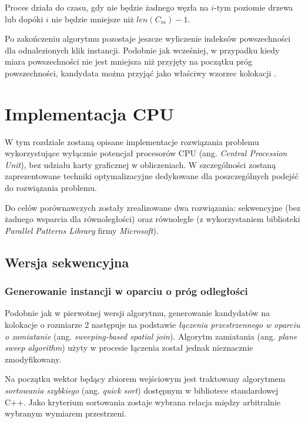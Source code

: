 \documentclass[12pt]{article}
\begin{document}
Proces działa do czasu, gdy nie będzie żadnego węzła na $ i $-tym poziomie drzewa lub dopóki $i$ nie będzie mniejsze niż $ len(C_{m}) - 1 $.

Po zakończeniu algorytmu pozostaje jeszcze wyliczenie indeksów powszechności dla odnalezionych klik instancji. Podobnie jak wcześniej, w przypadku kiedy miara powszechności nie jest mniejsza niż przyjęty na początku próg powszechności, kandydata można przyjąć jako właściwy wzorzec kolokacji \cite{huang}.

\newpage

\section{Implementacja CPU}

W tym rozdziale zostaną opisane implementacje rozwiązania problemu \cite{chinczyki} wykorzystujące wyłącznie potencjał procesorów CPU (ang. \textit{Central Procession Unit}), bez udziału karty graficznej w obliczeniach. W szczególności zostaną zaprezentowane techniki optymalizacyjne dedykowane dla poszczególnych podejść do rozwiązania problemu. 

Do celów porównawczych zostały zrealizowane dwa rozwiązania: sekwencyjne (bez żadnego wsparcia dla równoległości) oraz równoległe (z wykorzystaniem biblioteki \textit{Parallel Patterns Library} firmy \textit{Microsoft}). 

\subsection{Wersja sekwencyjna}

\subsubsection{Generowanie instancji w oparciu o próg odległości}

Podobnie jak w pierwotnej wersji algorytmu, generowanie kandydatów na kolokacje o rozmiarze 2 następuje na podstawie \textit{łączenia przestrzennego w oparciu o zamiatanie} (ang. \textit{sweeping-based spatial join}). Algorytm zamiatania (ang. \textit{plane sweep algorithm}) użyty w procesie łączenia został jednak nieznacznie zmodyfikowany.

Na początku wektor będący zbiorem wejściowym jest traktowany algorytmem \textit{sortowania szybkiego} (ang. \textit{quick sort}) dostępnym w bibliotece standardowej C++. Jako kryterium sortowania zostaje wybrana relacja między arbitralnie wybranym wymiarem przestrzeni.
\end{document}
